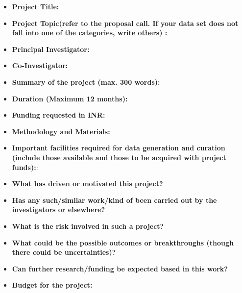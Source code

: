 \documentclass[a4paper,10pt,notitlepage]{article}
\begin{document}
\begin{itemize}
\item {\bf Project Title:}
    \item  {\bf Project Topic(refer to the proposal call. If your data set does not fall into one of the categories, write others) :}
    \item 
{\bf Principal Investigator:} 
\item {\bf Co-Investigator:} 
\item {\bf Summary of the project (max. 300 words):} 

\item {\bf Duration (Maximum 12 months):} 
\item {\bf  Funding requested in INR: } 
\item {\bf Methodology and Materials:}



\item {\bf Important facilities required for data generation  and curation (include those available and those to be acquired with project funds):}:  

\item {\bf What	has	driven	or	motivated	this	project? 
}  
\item {\bf Has	any	such/similar	work/kind of	been	carried	out	by	the	investigators	or	elsewhere?
} 
\item {\bf What	is	the	risk	involved	in	such	a	project?
}
\item {\bf  What	could	be	the	possible	outcomes	or	breakthroughs	(though	there	could	be	uncertainties)?
} 
\item {\bf  Can	further	research/funding	be expected	based	in	this	work?
}  
\item {\bf  Budget for the project:} 
\end{itemize}
\end{document}
